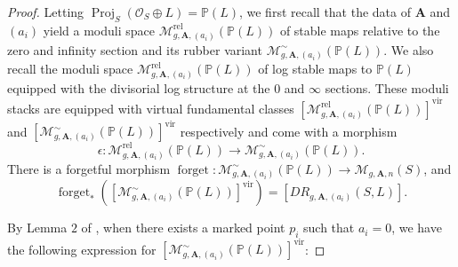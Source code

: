 \documentclass[12pt, oneside]{amsart}   	%
\newcommand{\vir}{\operatorname{vir}}
\newcommand{\forget}{\operatorname{forget}}
\newcommand{\proj}{\operatorname{Proj}}
\newcommand{\rel}{\operatorname{rel}}
\numberwithin{equation}{section}
\numberwithin{thm}{section}
\numberwithin{figure}{section}
\begin{document}
\begin{proof}



Letting $\proj_S(\mathcal{O}_S\oplus L) = \mathbb{P}(L)$, we first recall that the data of $\textbf{A}$ and $(a_i)$ yield a moduli space $\mathscr{M}^{\rel}_{g,\textbf{A},(a_i)}(\mathbb{P}(L))$ of stable maps relative to the zero and infinity section and its rubber variant $ \mathscr{M}^{\sim}_{g,\textbf{A},(a_i)}(\mathbb{P}(L)).$
We also recall the moduli space $\mathscr{M}^{\rel}_{g,\textbf{A},(a_i)}(\mathbb{P}(L))$ of log stable maps to $\mathbb{P}(L)$ equipped with the divisorial log structure at the $0$ and $\infty$ sections. These moduli stacks are equipped with virtual fundamental classes $[\mathscr{M}^{\rel}_{g,\textbf{A},(a_i)}(\mathbb{P}(L))]^{\vir}$ and $[\mathscr{M}^{\sim}_{g,\textbf{A},(a_i)}(\mathbb{P}(L))]^{\vir}$ respectively and come with a morphism 
$$\epsilon: \mathscr{M}_{g,\textbf{A},(a_i)}^{\rel}(\mathbb{P}(L)) \rightarrow \mathscr{M}^{\sim}_{g,\textbf{A},(a_i)}(\mathbb{P}(L)).$$
 There is a forgetful morphism $\forget: \mathscr{M}^{\sim}_{g,\textbf{A},(a_i)}(\mathbb{P}(L)) \rightarrow \mathscr{M}_{g,\textbf{A},n}(S)$, and
\[\forget_*([\mathscr{M}^{\sim}_{g,\textbf{A},(a_i)}(\mathbb{P}(L))]^{\vir}) = [DR_{g,\textbf{A},(a_i)}(S,L)].\]

By Lemma $2$ of \cite{topview}, when there exists a marked point $p_i$ such that $a_i = 0$, we have the following expression for $[\mathscr{M}^{\sim}_{g,\textbf{A},(a_i)}(\mathbb{P}(L))]^{\vir}$:


\end{proof}
\end{document}

